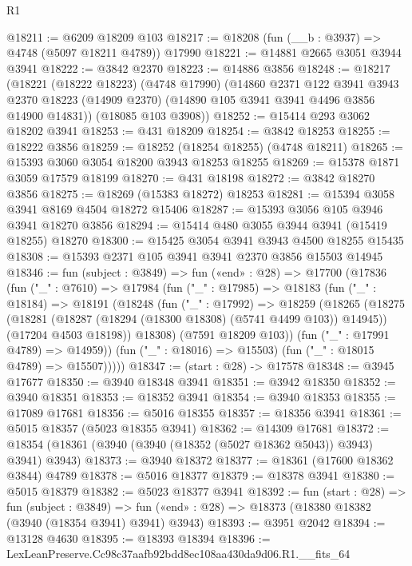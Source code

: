 \begin{lexlean}{R1}
\begin{coremodule}
@18211 := @6209 @18209 @103
@18217 := @18208 (fun (__b : @3937) => @4748 (@5097 @18211 @4789)) @17990
@18221 := @14881 @2665 @3051 @3944 @3941
@18222 := @3842 @2370
@18223 := @14886 @3856
@18248 := @18217
    (@18221
      (@18222 @18223)
      (@4748 @17990)
      (@14860
        @2371
        @122
        @3941
        @3943
        @2370
        @18223
        (@14909 @2370)
        (@14890 @105 @3941 @3941 @4496 @3856 @14900 @14831))
      (@18085 @103 @3908))
@18252 := @15414 @293 @3062 @18202 @3941
@18253 := @431 @18209
@18254 := @3842 @18253
@18255 := @18222 @3856
@18259 := @18252 (@18254 @18255) (@4748 @18211)
@18265 := @15393 @3060 @3054 @18200 @3943 @18253 @18255
@18269 := @15378 @1871 @3059 @17579 @18199
@18270 := @431 @18198
@18272 := @3842 @18270 @3856
@18275 := @18269 (@15383 @18272) @18253
@18281 := @15394 @3058 @3941 @8169 @4504 @18272 @15406
@18287 := @15393 @3056 @105 @3946 @3941 @18270 @3856
@18294 := @15414 @480 @3055 @3944 @3941 (@15419 @18255) @18270
@18300 := @15425 @3054 @3941 @3943 @4500 @18255 @15435
@18308 := @15393 @2371 @105 @3941 @3941 @2370 @3856 @15503 @14945
@18346 := fun (subject : @3849) =>
  fun («end» : @28) =>
  @17700
    (@17836
      (fun ("_" : @7610) =>
      @17984
        (fun ("_" : @17985) =>
        @18183
          (fun ("_" : @18184) =>
          @18191
            (@18248
              (fun ("_" : @17992) =>
              @18259
                (@18265
                  (@18275
                    (@18281 (@18287 (@18294 (@18300 @18308) (@5741 @4499 @103)) @14945))
                    (@17204 @4503 @18198))
                  @18308)
                (@7591 @18209 @103))
              (fun ("_" : @17991 @4789) => @14959))
            (fun ("_" : @18016) => @15503)
            (fun ("_" : @18015 @4789) => @15507)))))
@18347 := (start : @28) -> @17578
@18348 := @3945 @17677
@18350 := @3940 @18348 @3941
@18351 := @3942 @18350
@18352 := @3940 @18351
@18353 := @18352 @3941
@18354 := @3940 @18353
@18355 := @17089 @17681
@18356 := @5016 @18355
@18357 := @18356 @3941
@18361 := @5015 @18357 (@5023 @18355 @3941)
@18362 := @14309 @17681
@18372 := @18354 (@18361 (@3940 (@3940 (@18352 (@5027 @18362 @5043)) @3943) @3941) @3943)
@18373 := @3940 @18372
@18377 := @18361 (@17600 @18362 @3844) @4789
@18378 := @5016 @18377
@18379 := @18378 @3941
@18380 := @5015 @18379
@18382 := @5023 @18377 @3941
@18392 := fun (start : @28) =>
  fun (subject : @3849) =>
  fun («end» : @28) => @18373 (@18380 @18382 (@3940 (@18354 @3941) @3941) @3943)
@18393 := @3951 @2042
@18394 := @13128 @4630
@18395 := @18393 @18394
@18396 := LexLeanPreserve.Cc98c37aafb92bdd8ec108aa430da9d06.R1.__fits_64

\end{coremodule}
\end{lexlean}
